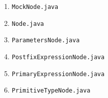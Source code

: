 \documentclass{report}
\begin{document}
\begin{itemize}
\begin{enumerate}
\begin{quotation}
\noindent 
\end{quotation}
\item \texttt{MockNode.java}
\begin{quotation}
\noindent 
\end{quotation}
\item \texttt{Node.java}
\begin{quotation}
\noindent 
\end{quotation}
\item \texttt{ParametersNode.java}
\begin{quotation}
\noindent 
\end{quotation}
\item \texttt{PostfixExpressionNode.java}
\begin{quotation}
\noindent 
\end{quotation}
\item \texttt{PrimaryExpressionNode.java}
\begin{quotation}
\noindent 
\end{quotation}
\item \texttt{PrimitiveTypeNode.java}
\begin{quotation}
\noindent 
\end{quotation}


\end{enumerate}
\end{itemize}
\end{document}
